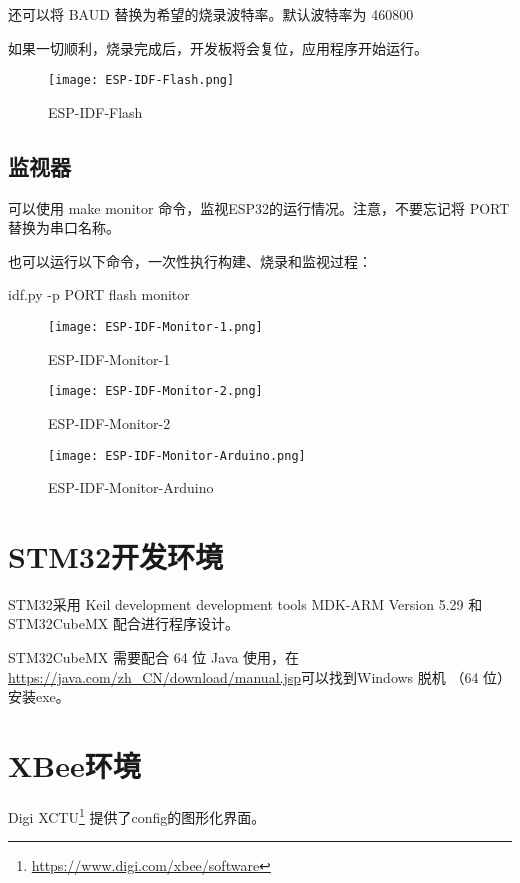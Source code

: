 还可以将 BAUD 替换为希望的烧录波特率。默认波特率为 460800

如果一切顺利，烧录完成后，开发板将会复位，应用程序开始运行。

\begin{figure}[htbp]
    \centering
    \texttt{[image: ESP-IDF-Flash.png]}
    \caption{ESP-IDF-Flash}
    \label{fig:ESP-IDF-Flash}
\end{figure}

\subsection{监视器}

可以使用 make monitor 命令，监视ESP32的运行情况。注意，不要忘记将 PORT 替换为串口名称。

也可以运行以下命令，一次性执行构建、烧录和监视过程：

\begin{tcolorbox}
    idf.py -p PORT flash monitor
\end{tcolorbox}

\begin{figure}[htbp]
    \centering
    \texttt{[image: ESP-IDF-Monitor-1.png]}
    \caption{ESP-IDF-Monitor-1}
    \label{fig:ESP-IDF-Monitor-1}
\end{figure}

\begin{figure}[htbp]
    \centering
    \texttt{[image: ESP-IDF-Monitor-2.png]}
    \caption{ESP-IDF-Monitor-2}
    \label{fig:ESP-IDF-Monitor-2}
\end{figure}

\begin{figure}[htbp]
    \centering
    \texttt{[image: ESP-IDF-Monitor-Arduino.png]}
    \caption{ESP-IDF-Monitor-Arduino}
    \label{fig:ESP-IDF-Monitor-Arduino}
\end{figure}


\section{STM32开发环境}

STM32采用 Keil development development tools MDK-ARM Version 5.29 和 STM32CubeMX 配合进行程序设计。

STM32CubeMX 需要配合 64 位 Java 使用，在\url{https://java.com/zh_CN/download/manual.jsp}可以找到Windows 脱机 （64 位）安装exe。

\section{XBee环境}

Digi XCTU\footnote{\url{https://www.digi.com/xbee/software}} 提供了config的图形化界面。